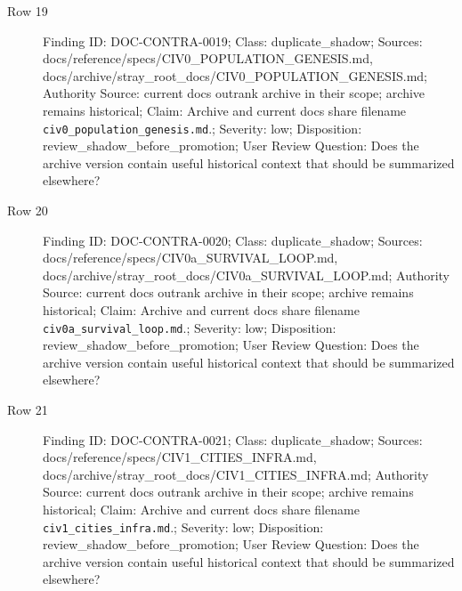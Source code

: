\documentclass[10.5pt,a4paper,openany]{book}
\begin{document}
\begin{description}
\item[Row 19] Finding ID: DOC-\allowbreak{}CONTRA-\allowbreak{}0019; Class: duplicate\_\allowbreak{}shadow; Sources: docs/\allowbreak{}reference/\allowbreak{}specs/\allowbreak{}CIV0\_\allowbreak{}POPULATION\_\allowbreak{}GENESIS.\allowbreak{}md, docs/\allowbreak{}archive/\allowbreak{}stray\_\allowbreak{}root\_\allowbreak{}docs/\allowbreak{}CIV0\_\allowbreak{}POPULATION\_\allowbreak{}GENESIS.\allowbreak{}md; Authority Source: current docs outrank archive in their scope; archive remains historical; Claim: Archive and current docs share filename \texttt{civ0\_\allowbreak{}population\_\allowbreak{}genesis.\allowbreak{}md}.\allowbreak{}; Severity: low; Disposition: review\_\allowbreak{}shadow\_\allowbreak{}before\_\allowbreak{}promotion; User Review Question: Does the archive version contain useful historical context that should be summarized elsewhere?
\item[Row 20] Finding ID: DOC-\allowbreak{}CONTRA-\allowbreak{}0020; Class: duplicate\_\allowbreak{}shadow; Sources: docs/\allowbreak{}reference/\allowbreak{}specs/\allowbreak{}CIV0a\_\allowbreak{}SURVIVAL\_\allowbreak{}LOOP.\allowbreak{}md, docs/\allowbreak{}archive/\allowbreak{}stray\_\allowbreak{}root\_\allowbreak{}docs/\allowbreak{}CIV0a\_\allowbreak{}SURVIVAL\_\allowbreak{}LOOP.\allowbreak{}md; Authority Source: current docs outrank archive in their scope; archive remains historical; Claim: Archive and current docs share filename \texttt{civ0a\_\allowbreak{}survival\_\allowbreak{}loop.\allowbreak{}md}.\allowbreak{}; Severity: low; Disposition: review\_\allowbreak{}shadow\_\allowbreak{}before\_\allowbreak{}promotion; User Review Question: Does the archive version contain useful historical context that should be summarized elsewhere?
\item[Row 21] Finding ID: DOC-\allowbreak{}CONTRA-\allowbreak{}0021; Class: duplicate\_\allowbreak{}shadow; Sources: docs/\allowbreak{}reference/\allowbreak{}specs/\allowbreak{}CIV1\_\allowbreak{}CITIES\_\allowbreak{}INFRA.\allowbreak{}md, docs/\allowbreak{}archive/\allowbreak{}stray\_\allowbreak{}root\_\allowbreak{}docs/\allowbreak{}CIV1\_\allowbreak{}CITIES\_\allowbreak{}INFRA.\allowbreak{}md; Authority Source: current docs outrank archive in their scope; archive remains historical; Claim: Archive and current docs share filename \texttt{civ1\_\allowbreak{}cities\_\allowbreak{}infra.\allowbreak{}md}.\allowbreak{}; Severity: low; Disposition: review\_\allowbreak{}shadow\_\allowbreak{}before\_\allowbreak{}promotion; User Review Question: Does the archive version contain useful historical context that should be summarized elsewhere?

\end{description}
\end{document}
